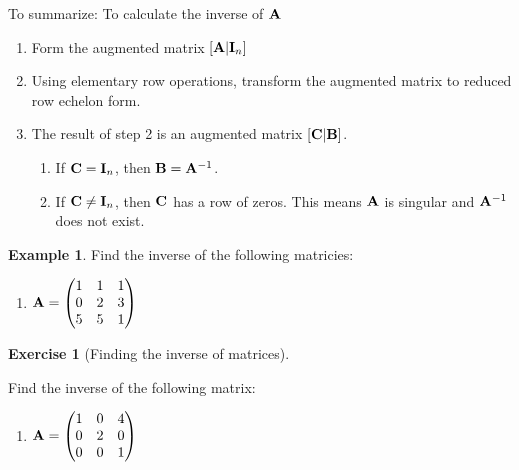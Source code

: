 \documentclass[
]{book}
\providecommand{\tightlist}{%
  \setlength{\itemsep}{0pt}\setlength{\parskip}{0pt}}
\theoremstyle{definition}
\theoremstyle{definition}
\newtheorem{example}{Example}[chapter]
\theoremstyle{definition}
\newtheorem{exercise}{Exercise}[chapter]
\theoremstyle{remark}
\begin{document}
To summarize: To calculate the inverse of \({\bf A}\)

\begin{enumerate}
\def\labelenumi{\arabic{enumi}.}
\item
  Form the augmented matrix \([ {\bf A} | {\bf I}_n]\)
\item
  Using elementary row operations, transform the augmented matrix to reduced row echelon form.
\item
  The result of step 2 is an augmented matrix \([ {\bf C} | {\bf B} ]\).

  \begin{enumerate}
  \def\labelenumii{\alph{enumii}.}
  \item
    If \({\bf C}={\bf I}_n\), then \({\bf B}={\bf A}^{-1}\).
  \item
    If \({\bf C}\ne{\bf I}_n\), then \(\bf C\) has a row of zeros. This means \({\bf A}\) is singular and \({\bf A}^{-1}\) does not exist.
  \end{enumerate}
\end{enumerate}

\begin{example}
\protect\hypertarget{exm:inverse}{}{\label{exm:inverse} }
Find the inverse of the following matricies:

\begin{enumerate}
\def\labelenumi{\arabic{enumi}.}
\tightlist
\item
  \({\bf A}=\begin{pmatrix} 1&1&1\\0&2&3\\5&5&1 \end{pmatrix}\)
\end{enumerate}
\end{example}

\begin{exercise}[Finding the inverse of matrices]
\protect\hypertarget{exr:inverse1}{}{\label{exr:inverse1} {} }

Find the inverse of the following matrix:

\begin{enumerate}
\def\labelenumi{\arabic{enumi}.}
\tightlist
\item
  \({\bf A}=\begin{pmatrix} 1&0&4\\0&2&0\\0&0&1 \end{pmatrix}\)
\end{enumerate}
\end{exercise}
\end{document}
